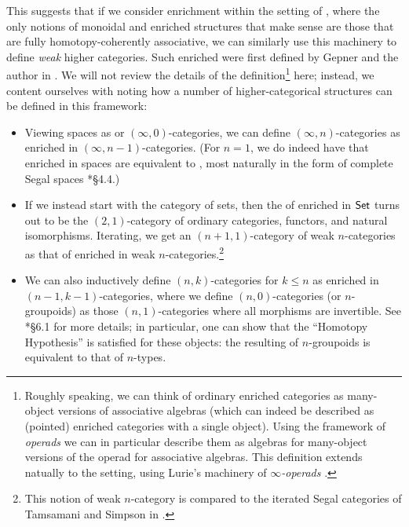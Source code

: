 \documentclass[a4paper,11pt]{article}
\begin{document}
This suggests that if we consider enrichment within the setting of
\icats{}, where the only notions of monoidal and enriched structures
that make sense are those that are fully homotopy-coherently
associative, we can similarly use this machinery to define \emph{weak}
higher categories. Such enriched \icats{} were first defined by Gepner
and the author in \cite{enr}. We will not review the details of
the definition\footnote{Roughly speaking, we can think of ordinary
  enriched categories as many-object versions of associative algebras
  (which can indeed be described as (pointed) enriched categories with
  a single object). Using the framework of \emph{operads} we can in
  particular describe them as algebras for many-object versions of the
  operad for associative algebras. This definition extends natually to
  the \icatl{} setting, using Lurie's machinery of
  \emph{$\infty$-operads} \cite{HA}.}
here; instead, we content ourselves with noting how a number of
higher-categorical structures can be defined in this framework:
\begin{itemize}
\item Viewing spaces as \igpds{} or $(\infty,0)$-categories, we can
  define $(\infty,n)$-categories as \icats{} enriched in
  $(\infty,n-1)$-categories. (For $n=1$, we do indeed have that
  \icats{} enriched in spaces are equivalent to \icats{}, most
  naturally in the form of complete Segal spaces \cite{enr}*{\S 4.4}.)
\item If we instead start with the category of sets, then the \icat{}
  of \icats{} enriched in $\textup{\textsf{Set}}$ turns out to be the $(2,1)$-category
  of ordinary categories, functors, and natural
  isomorphisms. Iterating, we get an $(n+1,1)$-category of weak
  $n$-categories as that of \icats{} enriched in weak
  $n$-categories.\footnote{This notion of weak $n$-category is
    compared to the iterated Segal categories of Tamsamani and Simpson
  in \cite{enrcomp}.}
\item We can also inductively define $(n,k)$-categories for $k \leq n$
  as \icats{} enriched in $(n-1,k-1)$-categories, where we define
  $(n,0)$-categories (or $n$-groupoids) as those $(n,1)$-categories
  where all morphisms are invertible. See \cite{enr}*{\S 6.1} for more
  details; in particular, one can show that the ``Homotopy
  Hypothesis'' is satisfied for these objects: the resulting \icat{} of
  $n$-groupoids is equivalent to that of $n$-types.
\end{itemize}
\end{document}

